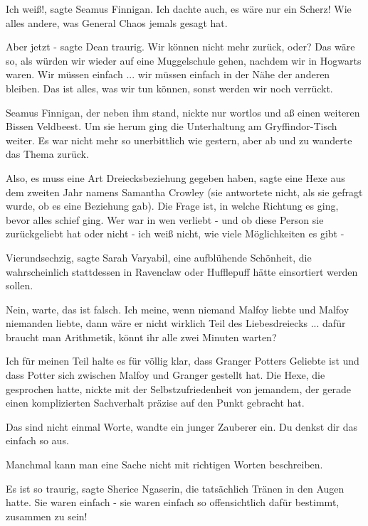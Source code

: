 \glqq{}Ich weiß!\grqq{}, sagte Seamus Finnigan. \glqq{}Ich dachte auch, es wäre
nur ein Scherz! Wie alles andere, was General Chaos jemals gesagt hat.\grqq{}

\glqq{}Aber jetzt -\grqq{} sagte Dean traurig. \glqq{}Wir können nicht mehr
zurück, oder? Das wäre so, als würden wir wieder auf eine Muggelschule gehen,
nachdem wir in Hogwarts waren. Wir müssen einfach ... wir müssen einfach in der
Nähe der anderen bleiben. Das ist alles, was wir tun können, sonst werden wir
noch verrückt.\grqq{}

Seamus Finnigan, der neben ihm stand, nickte nur wortlos und aß einen weiteren
Bissen Veldbeest. Um sie herum ging die Unterhaltung am Gryffindor-Tisch weiter.
Es war nicht mehr so unerbittlich wie gestern, aber ab und zu wanderte das Thema
zurück.

\glqq{}Also, es muss eine Art Dreiecksbeziehung gegeben haben\grqq{}, sagte eine
Hexe aus dem zweiten Jahr namens Samantha Crowley (sie antwortete nicht, als sie
gefragt wurde, ob es eine Beziehung gab). \glqq{}Die Frage ist, in welche
Richtung es ging, bevor alles schief ging. Wer war in wen verliebt - und ob
diese Person sie zurückgeliebt hat oder nicht - ich weiß nicht, wie viele
Möglichkeiten es gibt -\grqq{}

\glqq{}Vierundsechzig\grqq{}, sagte Sarah Varyabil, eine aufblühende Schönheit,
die wahrscheinlich stattdessen in Ravenclaw oder Hufflepuff hätte einsortiert
werden sollen.

\glqq{}Nein, warte, das ist falsch. Ich meine, wenn niemand Malfoy liebte und
Malfoy niemanden liebte, dann wäre er nicht wirklich Teil des Liebesdreiecks ...
dafür braucht man Arithmetik, könnt ihr alle zwei Minuten warten?\grqq{}

\glqq{}Ich für meinen Teil halte es für völlig klar, dass Granger Potters
Geliebte ist und dass Potter sich zwischen Malfoy und Granger gestellt
hat.\grqq{} Die Hexe, die gesprochen hatte, nickte mit der Selbstzufriedenheit
von jemandem, der gerade einen komplizierten Sachverhalt präzise auf den Punkt
gebracht hat.

\glqq{}Das sind nicht einmal Worte\grqq{}, wandte ein junger Zauberer ein. \glqq{}
Du denkst dir das einfach so aus.\grqq{}

\glqq{}Manchmal kann man eine Sache nicht mit richtigen Worten
beschreiben.\grqq{}

\glqq{}Es ist so traurig\grqq{}, sagte Sherice Ngaserin, die tatsächlich Tränen
in den Augen hatte. \glqq{}Sie waren einfach - sie waren einfach so
offensichtlich dafür bestimmt, zusammen zu sein!\grqq{}

